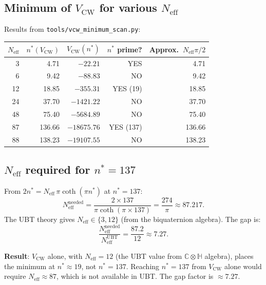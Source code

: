 \documentclass[12pt,a4paper]{article}
\theoremstyle{definition}
\theoremstyle{remark}
\newcommand{\Neff}{N_{\mathrm{eff}}}
\newcommand{\VCW}{V_{\mathrm{CW}}}
\begin{document}
\subsection{Minimum of $\VCW$ for various $\Neff$}

Results from \texttt{tools/vcw\_minimum\_scan.py}:

\begin{center}
\begin{tabular}{rrrrr}
  \toprule
  $\Neff$ & $n^*(\VCW)$ & $V_{\mathrm{CW}}(n^*)$ & $n^*$ prime? & Approx.\ $\Neff\pi/2$ \\
  \midrule
  3   &   4.71  & $-22.21$    & YES & 4.71 \\
  6   &   9.42  & $-88.83$    & NO  & 9.42 \\
  12  &  18.85  & $-355.31$   & YES (19) & 18.85 \\
  24  &  37.70  & $-1421.22$  & NO  & 37.70 \\
  48  &  75.40  & $-5684.89$  & NO  & 75.40 \\
  87  & 136.66  & $-18675.76$ & YES (137) & 136.66 \\
  88  & 138.23  & $-19107.55$ & NO  & 138.23 \\
  \bottomrule
\end{tabular}
\end{center}

\subsection{$\Neff$ required for $n^* = 137$}

From $2n^* = \Neff\,\pi\coth(\pi n^*)$ at $n^* = 137$:
\begin{equation}
  \Neff^{\mathrm{needed}} = \frac{2 \times 137}{\pi \coth(\pi \times 137)}
  = \frac{274}{\pi} \approx 87.217 .
  \label{eq:Neff_needed}
\end{equation}
The UBT theory gives $\Neff \in \{3, 12\}$ (from the biquaternion algebra).
The gap is:
\begin{equation}
  \frac{\Neff^{\mathrm{needed}}}{\Neff^{\mathrm{UBT}}}
  = \frac{87.2}{12} \approx 7.27 .
  \label{eq:gap_factor}
\end{equation}

\begin{warnbox}
\textbf{Result}: $\VCW$ alone, with $\Neff = 12$ (the UBT value from
$\mathbb{C}\otimes\mathbb{H}$ algebra), places the minimum at $n^* \approx 19$,
not $n^* = 137$.  Reaching $n^*=137$ from $\VCW$ alone would require
$\Neff \approx 87$, which is not available in UBT.  The gap factor is
$\approx 7.27$.
\end{warnbox}
\end{document}
